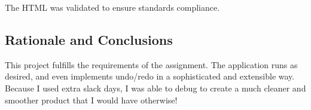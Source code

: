 \documentclass[11pt,letterpaper]{article}
\begin{document}
The HTML was validated to ensure standards compliance.


\subsection{Rationale and Conclusions}
This project fulfills the requirements of the assignment. The application runs as desired, and even implements undo/redo in a sophisticated and extensible way. Because I used extra slack days, I was able to debug to create a much cleaner and smoother product that I would have otherwise!
\end{document}
